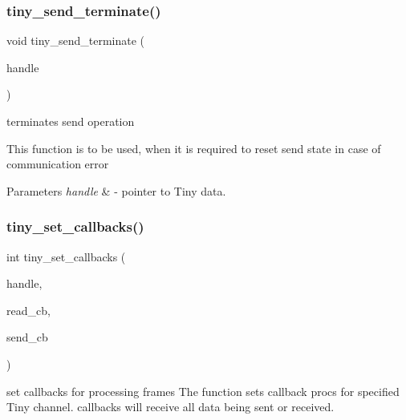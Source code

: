 \subsubsection{\texorpdfstring{tiny\+\_\+send\+\_\+terminate()}{tiny\_send\_terminate()}}
{\footnotesize\ttfamily void tiny\+\_\+send\+\_\+terminate (\begin{DoxyParamCaption}\item[{\hyperlink{structSTinyData}{S\+Tiny\+Data} $\ast$}]{handle }\end{DoxyParamCaption})}



terminates send operation 

This function is to be used, when it is required to reset send state in case of communication error


\begin{DoxyParams}{Parameters}
{\em handle} & -\/ pointer to Tiny data. \\
\hline
\end{DoxyParams}
\mbox{\label{group__ADVANCED__API_gac562103dd1699b82fddf29dccdc0ec7c}} 
\subsubsection{\texorpdfstring{tiny\+\_\+set\+\_\+callbacks()}{tiny\_set\_callbacks()}}
{\footnotesize\ttfamily int tiny\+\_\+set\+\_\+callbacks (\begin{DoxyParamCaption}\item[{\hyperlink{structSTinyData}{S\+Tiny\+Data} $\ast$}]{handle,  }\item[{\hyperlink{tiny__types_8h_ad6bf709565b8aecb9e6ecf196f219d54}{on\+\_\+frame\+\_\+cb\+\_\+t}}]{read\+\_\+cb,  }\item[{\hyperlink{tiny__types_8h_ad6bf709565b8aecb9e6ecf196f219d54}{on\+\_\+frame\+\_\+cb\+\_\+t}}]{send\+\_\+cb }\end{DoxyParamCaption})}



set callbacks for processing frames The function sets callback procs for specified Tiny channel. callbacks will receive all data being sent or received. 



